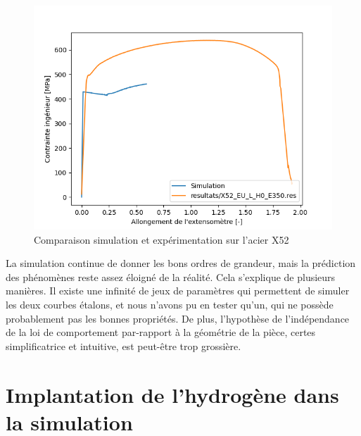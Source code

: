 \documentclass[a4paper, french, 11pt, draft]{article}
\begin{document}
    \begin{figure}
        \includegraphics{image/INFLUENCE/X52_compa}
        \centering
        \caption{Comparaison simulation et expérimentation sur l'acier X52}
        \label{fig:X52_compar}
    \end{figure}
    
    La simulation continue de donner les bons ordres de grandeur, mais la prédiction des phénomènes reste assez éloigné de la réalité. Cela s'explique de plusieurs manières.
    Il existe une infinité de jeux de paramètres qui permettent de simuler les deux courbes étalons, et nous n'avons pu en tester qu'un, qui ne possède probablement pas les bonnes propriétés.
    De plus, l'hypothèse de l'indépendance de la loi de comportement par-rapport à la géométrie de la pièce, certes simplificatrice et intuitive, est peut-être trop grossière.


    \section{Implantation de l'hydrogène dans la simulation}
\end{document}
